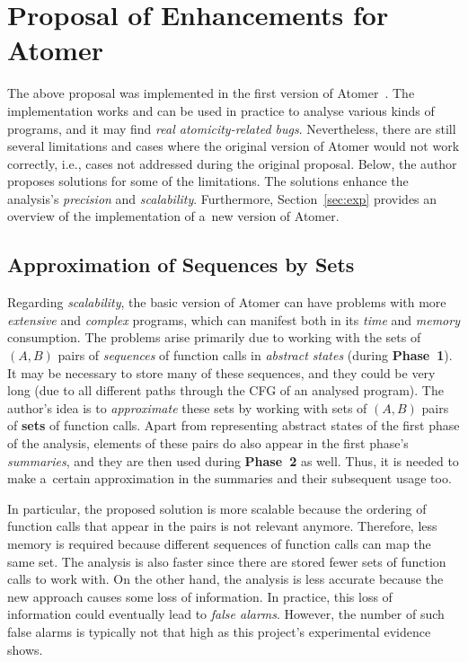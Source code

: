 \documentclass{ExcelAtFIT}
\theoremstyle{example}
\begin{document}
\section{\hspace{-.15em}Proposal of Enhancements for Atomer}
\label{sec:proposal}

The above proposal was implemented in the first version of Atomer~\cite{harmimBP}. The implementation works and can be used in practice to analyse various kinds of programs, and it may find \emph{real atomicity-related bugs}. Nevertheless, there are still several limitations and cases where the original version of Atomer would not work correctly, i.e., cases not addressed during the original proposal. Below, the author proposes solutions for some of the limitations. The solutions enhance the analysis's \emph{precision} and \emph{scalability}. Furthermore, Section~\ref{sec:exp} provides an overview of the implementation of a~new version of Atomer.

\subsection{Approximation of Sequences by Sets}

Regarding \emph{scalability}, the basic version of Atomer can have problems with more \emph{extensive} and \emph{complex} programs, which can manifest both in its \emph{time} and \emph{memory} consumption. The problems arise primarily due to working with the sets of ${ (A, B) }$ pairs of \emph{sequences} of function calls in \emph{abstract states} (during \textbf{Phase~1}). It may be necessary to store many of these sequences, and they could be very long (due to all different paths through the CFG of an analysed program). The author's idea is to \emph{approximate} these sets by working with sets of ${ (A, B) }$ pairs of \textbf{sets} of function calls. Apart from representing abstract states of the first phase of the analysis, elements of these pairs do also appear in the first phase's \emph{summaries}, and they are then used during \textbf{Phase~2} as well. Thus, it is needed to make a~certain approximation in the summaries and their subsequent usage too.

In particular, the proposed solution is more scalable because the ordering of function calls that appear in the pairs is not relevant anymore. Therefore, less memory is required because different sequences of function calls can map the same set. The analysis is also faster since there are stored fewer sets of function calls to work with. On the other hand, the analysis is less accurate because the new approach causes some loss of information. In practice, this loss of information could eventually lead to \emph{false alarms}. However, the number of such false alarms is typically not that high as this project's experimental evidence shows.
\end{document}
